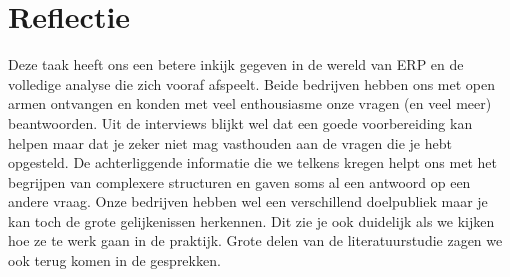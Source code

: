
\chapter{Reflectie}
\label{ch:reflectie}

Deze taak heeft ons een betere inkijk gegeven in de wereld van ERP en de volledige analyse die zich vooraf afspeelt. Beide bedrijven hebben ons met open armen ontvangen en konden met veel enthousiasme onze vragen (en veel meer) beantwoorden. Uit de interviews blijkt wel dat een goede voorbereiding kan helpen maar dat je zeker niet mag vasthouden aan de vragen die je hebt opgesteld. De achterliggende informatie die we telkens kregen helpt ons met het begrijpen van complexere structuren en gaven soms al een antwoord op een andere vraag. Onze bedrijven hebben wel een verschillend doelpubliek maar je kan toch de grote gelijkenissen herkennen. Dit zie je ook duidelijk als we kijken hoe ze te werk gaan in de praktijk. Grote delen van de literatuurstudie zagen we ook terug komen in de gesprekken.

